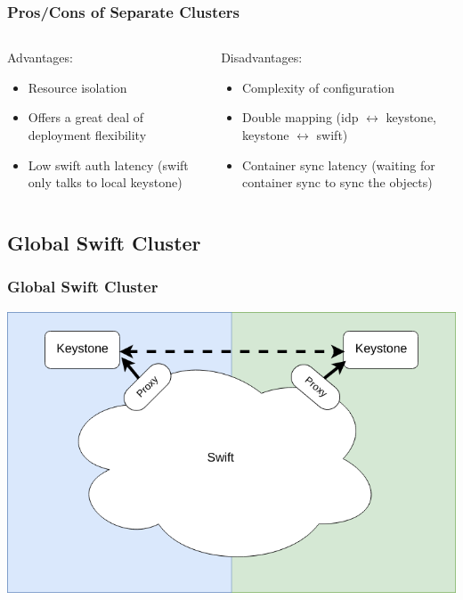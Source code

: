 \documentclass[aspectratio=169,11pt,hyperref={colorlinks=true}]{beamer}
\begin{document}
\begin{frame}
\frametitle{Pros/Cons of Separate Clusters}
\begin{columns}[T]
    \begin{column}{.48\textwidth}
        Advantages:
        \begin{itemize}
            \item Resource isolation
            \item Offers a great deal of deployment flexibility
            \item Low swift auth latency (swift only talks to local keystone)
        \end{itemize}
    \end{column}
    \begin{column}{.48\textwidth}
        Disadvantages:
        \begin{itemize}
            \item Complexity of configuration
            \item Double mapping (idp $\leftrightarrow$ keystone, keystone $\leftrightarrow$ swift)
            \item Container sync latency (waiting for container sync to sync the objects)
        \end{itemize}
    \end{column}
\end{columns}
\end{frame}

\subsection{Global Swift Cluster}
\begin{frame}
\frametitle{Global Swift Cluster}
\centering
\includegraphics[width=.775\textwidth]{swift-federation-global.png}
\end{frame}
\end{document}
